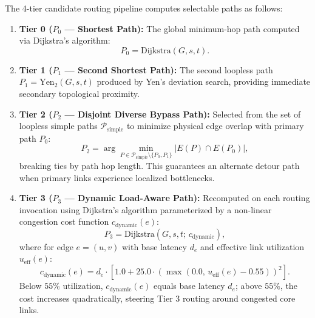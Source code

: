 \documentclass[12pt,a4paper,oneside]{report}
\begin{document}
The 4-tier candidate routing pipeline computes selectable paths as follows:
\begin{enumerate}
    \item \textbf{Tier 0 ($P_0$ --- Shortest Path):} The global minimum-hop path computed via Dijkstra's algorithm:
    \begin{equation}
    P_0 = \text{Dijkstra}(G, s, t).
    \end{equation}
    \item \textbf{Tier 1 ($P_1$ --- Second Shortest Path):} The second loopless path $P_1 = \text{Yen}_2(G, s, t)$ produced by Yen's deviation search, providing immediate secondary topological proximity.
    \item \textbf{Tier 2 ($P_2$ --- Disjoint Diverse Bypass Path):} Selected from the set of loopless simple paths $\mathcal{P}_{\text{simple}}$ to minimize physical edge overlap with primary path $P_0$:
    \begin{equation}
    P_2 = \arg\min_{P \in \mathcal{P}_{\text{simple}} \setminus \{P_0, P_1\}} |E(P) \cap E(P_0)|,
    \end{equation}
    breaking ties by path hop length. This guarantees an alternate detour path when primary links experience localized bottlenecks.
    \item \textbf{Tier 3 ($P_3$ --- Dynamic Load-Aware Path):} Recomputed on each routing invocation using Dijkstra's algorithm parameterized by a non-linear congestion cost function $c_{\text{dynamic}}(e)$:
    \begin{equation}
    \label{eq:dynamic_cost}
    P_3 = \text{Dijkstra}(G, s, t; \, c_{\text{dynamic}}),
    \end{equation}
    where for edge $e = (u, v)$ with base latency $d_e$ and effective link utilization $u_{\text{eff}}(e)$:
    \begin{equation}
    \label{eq:dynamic_cost_formula}
    c_{\text{dynamic}}(e) = d_e \cdot \left[ 1.0 + 25.0 \cdot \left(\max(0.0, \, u_{\text{eff}}(e) - 0.55)\right)^2 \right].
    \end{equation}
    Below $55\%$ utilization, $c_{\text{dynamic}}(e)$ equals base latency $d_e$; above $55\%$, the cost increases quadratically, steering Tier 3 routing around congested core links.
\end{enumerate}
\end{document}
